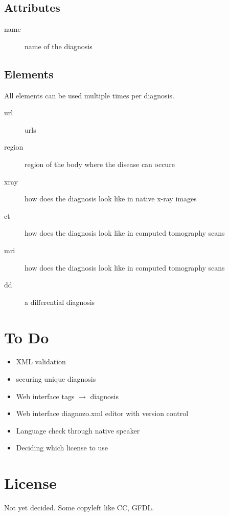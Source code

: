 \documentclass{article}
\begin{document}
\subsection{Attributes}

\begin{description}
	\item[name] name of the diagnosis
\end{description}

\subsection{Elements}
All elements can be used multiple times per diagnosis.

\begin{description}
	\item[url] urls
	\item[region] region of the body where the disease can occure
	\item[xray] how does the diagnosis look like in native x-ray images
	\item[ct] how does the diagnosis look like in computed tomography scans
	\item[mri] how does the diagnosis look like in computed tomography scans
	\item[dd] a differential diagnosis
\end{description}

\section{To Do}
\begin{itemize}
\item XML validation
\item securing unique diagnosis
\item Web interface tags $\rightarrow$ diagnosis
\item Web interface diagnozo.xml editor with version control
\item Language check through native speaker
\item Deciding which license to use
\end{itemize}

\section{License}
Not yet decided. Some copyleft like CC, GFDL.
\end{document}
